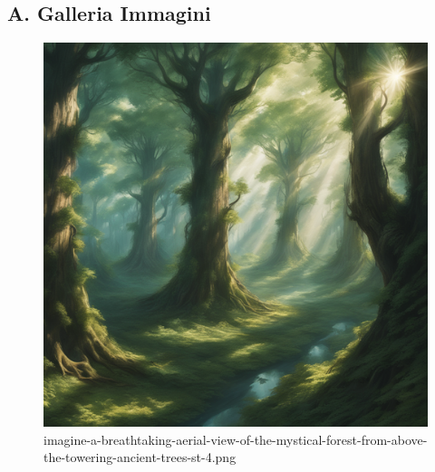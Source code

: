 \subsection{A. Galleria Immagini}\label{a.-galleria-immagini}

\begin{figure}
\centering
\includegraphics{imagine-a-breathtaking-aerial-view-of-the-mystical-forest-from-above-the-towering-ancient-trees-st-4.png}
\caption{imagine-a-breathtaking-aerial-view-of-the-mystical-forest-from-above-the-towering-ancient-trees-st-4.png}
\end{figure}

